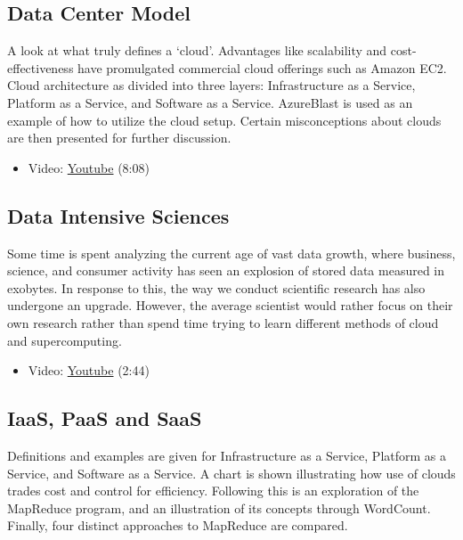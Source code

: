 \subsection{Data Center Model}\label{data-center-model}

A look at what truly defines a `cloud'. Advantages like scalability and
cost-effectiveness have promulgated commercial cloud offerings such as
Amazon EC2. Cloud architecture as divided into three layers:
Infrastructure as a Service, Platform as a Service, and Software as a
Service. AzureBlast is used as an example of how to utilize the cloud
setup. Certain misconceptions about clouds are then presented for
further discussion.

\begin{itemize}
\tightlist
\item
  Video: \href{https://www.youtube.com/watch?v=6Hq_LuLB-RU}{Youtube}
  (8:08)
\end{itemize}

\subsection{Data Intensive Sciences}\label{data-intensive-sciences}

Some time is spent analyzing the current age of vast data growth, where
business, science, and consumer activity has seen an explosion of stored
data measured in exobytes. In response to this, the way we conduct
scientific research has also undergone an upgrade. However, the average
scientist would rather focus on their own research rather than spend
time trying to learn different methods of cloud and supercomputing.

\begin{itemize}
\tightlist
\item
  Video: \href{https://www.youtube.com/watch?v=Ptoj3BME_z4}{Youtube}
  (2:44)
\end{itemize}

\subsection{IaaS, PaaS and SaaS}\label{iaas-paas-and-saas}

Definitions and examples are given for Infrastructure as a Service,
Platform as a Service, and Software as a Service. A chart is shown
illustrating how use of clouds trades cost and control for efficiency.
Following this is an exploration of the MapReduce program, and an
illustration of its concepts through WordCount. Finally, four distinct
approaches to MapReduce are compared.

